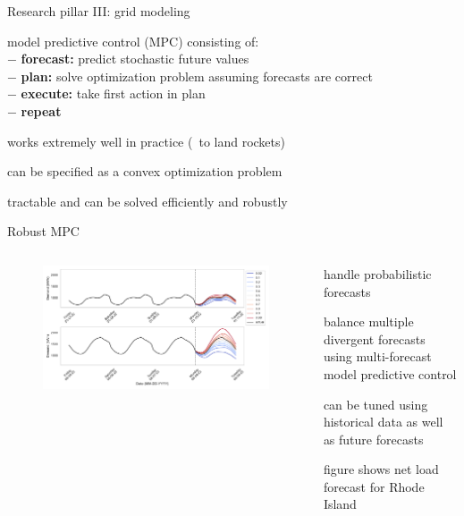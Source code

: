 \documentclass[aspectratio=169,11pt]{beamer}
\begin{document}
\begin{frame}{Research pillar III: grid modeling}
\BIT
\item model predictive control (MPC) consisting of: \\
\hspace{12mm} $-$ \textbf{forecast:} predict stochastic future values \\
\hspace{12mm} $-$ \textbf{plan:} solve optimization problem assuming forecasts are correct \\
\hspace{12mm} $-$ \textbf{execute:} take first action in plan \\
\hspace{12mm} $-$ \textbf{repeat} 
\item works extremely well in practice (\eg \ to land rockets)
\item can be specified as a convex optimization problem
\item tractable and can be solved efficiently and robustly
\EIT
\end{frame}

\begin{frame}{Robust MPC}
\begin{columns}
	\begin{column}{0.65\textwidth}
		\begin{figure}
			\centering
			\includegraphics[width=\columnwidth]{./figures/marginal_quantile_forecasts.pdf}
		\end{figure}
	\end{column}
	\begin{column}{0.35\textwidth}
		\BIT
		\item handle probabilistic forecasts
		\item balance multiple divergent forecasts using multi-forecast model predictive control
		\item can be tuned using historical data as well as future forecasts
		\item figure shows net load forecast for Rhode Island
		\EIT
	\end{column}
\end{columns}
\end{frame}
\end{document}
